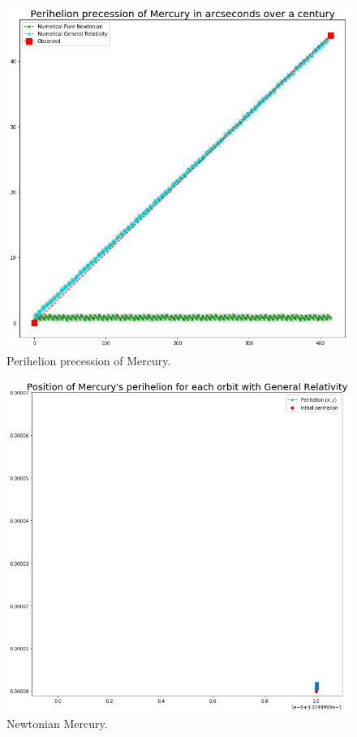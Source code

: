 \documentclass[a4paper, fontsize=11pt]{article}
\begin{document}
\begin{figure}[H]
\centering
\includegraphics[scale=0.5]{plots/PerihelionPrecessionMercury}
\caption{Perihelion precession of Mercury.}
\label{PerihelionMercury}
\end{figure}

\begin{figure}[H]
\includegraphics[scale=0.5]{plots/NewtonianMercury}
\caption{Newtonian Mercury.}
\label{fig:NewtonianMercury}
\end{figure}
\end{document}
